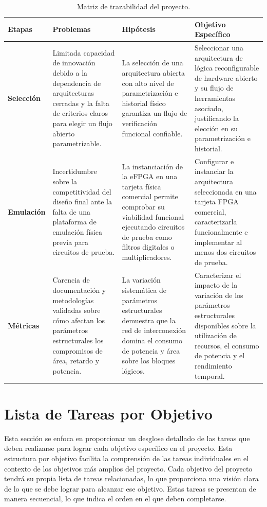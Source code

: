     \begin{table}[htbp]
\small
\begin{tabularx}{\textwidth}{|p{1.8cm}|X|X|X|}
\hline
\textbf{Etapas} & \textbf{Problemas} & \textbf{Hipótesis} & \textbf{Objetivo Específico} \\ \hline

\textbf{Selección} & 
Limitada capacidad de innovación debido a la dependencia de arquitecturas cerradas y la falta de criterios claros para elegir un flujo abierto parametrizable. & 
La selección de una arquitectura abierta con alto nivel de parametrización e historial físico garantiza un flujo de verificación funcional confiable. & 
Seleccionar una arquitectura de lógica reconfigurable de hardware abierto y su flujo de herramientas asociado, justificando la elección en su parametrización e historial. \\ \hline

\textbf{Emulación} & 
Incertidumbre sobre la competitividad del diseño final ante la falta de una plataforma de emulación física previa para circuitos de prueba. & 
La instanciación de la eFPGA en una tarjeta física comercial permite comprobar su viabilidad funcional ejecutando circuitos de prueba como filtros digitales o multiplicadores. & 
Configurar e instanciar la arquitectura seleccionada en una tarjeta FPGA comercial, caracterizarla funcionalmente e implementar al menos dos circuitos de prueba. \\ \hline

\textbf{Métricas} & 
Carencia de documentación y metodologías validadas sobre cómo afectan los parámetros estructurales los compromisos de área, retardo y potencia. & 
La variación sistemática de parámetros estructurales demuestra que la red de interconexión domina el consumo de potencia y área sobre los bloques lógicos. & 
Caracterizar el impacto de la variación de los parámetros estructurales disponibles sobre la utilización de recursos, el consumo de potencia y el rendimiento temporal. \\ \hline
\end{tabularx}
\caption{Matriz de trazabilidad del proyecto.}
\label{tab:matriz_trazabilidad}
\end{table}
 
\section{Lista de Tareas por Objetivo}

Esta sección se enfoca en proporcionar un desglose detallado de las tareas que 
deben realizarse para lograr cada objetivo específico en el proyecto. Esta 
estructura por objetivo facilita la comprensión de las tareas individuales en el 
contexto de los objetivos más amplios del proyecto. Cada objetivo del proyecto 
tendrá su propia lista de tareas relacionadas, lo que proporciona una visión clara 
de lo que se debe lograr para alcanzar ese objetivo. Estas tareas se presentan de 
manera secuencial, lo que indica el orden en el que deben completarse.

